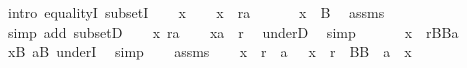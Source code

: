 \begin{isabellebody}
%
\isadelimproof
%
\endisadelimproof
%
\isatagproof
{}\isamarkupfalse%
\ {\isacharparenleft}{\kern0pt}intro\ equalityI\ subsetI{\isacharparenright}{\kern0pt}\isanewline
\ \ \isamarkupfalse%
\ x\isanewline
\ \ \isamarkupfalse%
\ {\isachardoublequoteopen}x\ {\isasymin}\ r{\isacharminus}{\kern0pt}{\isacharbackquote}{\kern0pt}{\isacharbackquote}{\kern0pt}{\isacharbraceleft}{\kern0pt}a{\isacharbraceright}{\kern0pt}{\isachardoublequoteclose}\isanewline
\ \ \isamarkupfalse%
\isanewline
\ \ \isamarkupfalse%
\ {\isachardoublequoteopen}x\ {\isasymin}\ B{\isachardoublequoteclose}\ \isamarkupfalse%
\ assms\ \isamarkupfalse%
\ {\isacharparenleft}{\kern0pt}simp\ add{\isacharcolon}{\kern0pt}\ subsetD{\isacharparenright}{\kern0pt}\isanewline
\ \ \isamarkupfalse%
\ {\isacartoucheopen}x{\isasymin}\ r{\isacharminus}{\kern0pt}{\isacharbackquote}{\kern0pt}{\isacharbackquote}{\kern0pt}{\isacharbraceleft}{\kern0pt}a{\isacharbraceright}{\kern0pt}{\isacartoucheclose}\isanewline
\ \ \isamarkupfalse%
\ {\isachardoublequoteopen}{\isasymlangle}x{\isacharcomma}{\kern0pt}a{\isasymrangle}\ {\isasymin}\ r{\isachardoublequoteclose}\ \isamarkupfalse%
\ underD\ \isamarkupfalse%
\ simp\isanewline
\ \ \isamarkupfalse%
\isanewline
\ \ \isamarkupfalse%
\ {\isachardoublequoteopen}x\ {\isasymin}\ {\isacharparenleft}{\kern0pt}r{\isasyminter}B{\isasymtimes}B{\isacharparenright}{\kern0pt}{\isacharminus}{\kern0pt}{\isacharbackquote}{\kern0pt}{\isacharbackquote}{\kern0pt}{\isacharbraceleft}{\kern0pt}a{\isacharbraceright}{\kern0pt}{\isachardoublequoteclose}\ \isamarkupfalse%
\ {\isacartoucheopen}x{\isasymin}B{\isacartoucheclose}\ {\isacartoucheopen}a{\isasymin}B{\isacartoucheclose}\ underI\ \isamarkupfalse%
\ simp\isanewline
{}\isamarkupfalse%
\isanewline
\ \ \isamarkupfalse%
\ assms\isanewline
\ \ \isamarkupfalse%
\ {\isachardoublequoteopen}x\ {\isasymin}\ r\ {\isacharminus}{\kern0pt}{\isacharbackquote}{\kern0pt}{\isacharbackquote}{\kern0pt}\ {\isacharbraceleft}{\kern0pt}a{\isacharbraceright}{\kern0pt}{\isachardoublequoteclose}\ \ \ {\isachardoublequoteopen}x\ {\isasymin}\ {\isacharparenleft}{\kern0pt}r\ {\isasyminter}\ B{\isasymtimes}B{\isacharparenright}{\kern0pt}\ {\isacharminus}{\kern0pt}{\isacharbackquote}{\kern0pt}{\isacharbackquote}{\kern0pt}\ {\isacharbraceleft}{\kern0pt}a{\isacharbraceright}{\kern0pt}{\isachardoublequoteclose}\ \ x\isanewline

\end{isabellebody}
